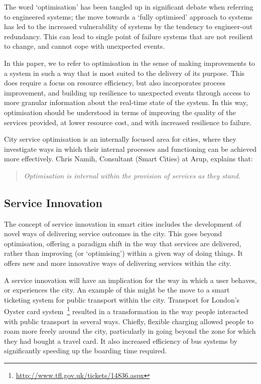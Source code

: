 \documentclass[conference]{IEEEtran}
\begin{document}
The word `optimisation' has been tangled up in significant debate when
referring to engineered systems; the move towards a `fully optimised'
approach to systems has led to the increased vulnerability of systems
by the tendency to engineer-out redundancy. This can lead to single
point of failure systems that are not resilient to change, and cannot
cope with unexpected events.

In this paper, we to refer to optimisation in the sense of making
improvements to a system in such a way that is most suited to the
delivery of its purpose. This does require a focus on resource
efficiency, but also incorporates process improvement, and building up
resilience to unexpected events through access to more granular
information about the real-time state of the system. In this way,
optimisation should be understood in terms of improving the quality of
the services provided, at lower resource cost, and with increased
resilience to failure.

City service optimisation is an internally focused area for cities,
where they investigate ways in which their internal processes and
functioning can be achieved more effectively. Chris Namih, Consultant
(Smart Cities) at Arup, explains that:

\begin{quote}
{\emph{Optimisation is internal within the provision of services as they
stand.}}~\cite{namih:2012}
\end{quote}

\subsection{Service Innovation}
The concept of service innovation in smart cities includes the
development of novel ways of delivering service outcomes in the
city. This goes beyond optimisation, offering a paradigm shift in the
way that services are delivered, rather than improving (or
`optimising') within a given way of doing things. It offers new and
more innovative ways of delivering services within the city.

A service innovation will have an implication for the way in which a
user behaves, or experiences the city. An example of this might be the
move to a smart ticketing system for public transport within the
city. Transport for London's Oyster card
system~\footnote{\url{http://www.tfl.gov.uk/tickets/14836.aspx}}
resulted in a transformation in the way people interacted with public
transport in several ways. Chiefly, flexible charging allowed people
to roam more freely around the city, particularly in going beyond the
zone for which they had bought a travel card. It also increased
efficiency of bus systems by significantly speeding up the boarding
time required.
\end{document}
